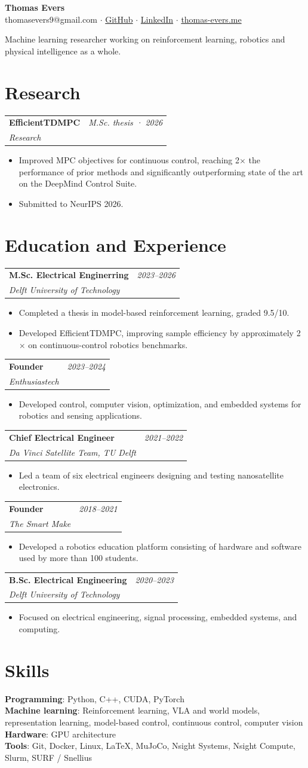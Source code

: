 \documentclass[10pt,a4paper]{article}
\makeatletter
\newcommand{\entry}[4]{%
  \begin{tabular*}{\textwidth}{@{\extracolsep{\fill}}lr}
    \textbf{#2} & \textit{#1}\\
    \textit{#3} &
  \end{tabular*}
  \vspace{-0.7em}
  \begin{itemize}[leftmargin=1.25em,itemsep=0.05em,topsep=0.25em]
    #4
  \end{itemize}
}
\newcommand{\skill}[2]{\textbf{#1}: #2\\[0.2em]}
\makeatother
\begin{document}
\begin{center}
  {\LARGE\bfseries Thomas Evers}\\[0.35em]
  thomasevers9@gmail.com $\cdot$
  \href{https://github.com/Thomasevers2517}{GitHub} $\cdot$
  \href{https://nl.linkedin.com/in/thomas-evers-40b255185/en}{LinkedIn} $\cdot$
  \href{https://thomas-evers.me}{thomas-evers.me}
\end{center}

\vspace{-0.4em}
Machine learning researcher working on reinforcement learning, robotics and physical intelligence as a whole.

\section{Research}
\entry{M.Sc. thesis · 2026}{EfficientTDMPC}{Research}{\item Improved MPC objectives for continuous control, reaching 2$\times$ the performance of prior methods and significantly outperforming state of the art on the DeepMind Control Suite. \item Submitted to NeurIPS 2026.}

\section{Education and Experience}
\entry{2023--2026}{M.Sc. Electrical Enginerring}{Delft University of Technology}{\item Completed a thesis in model-based reinforcement learning, graded 9.5/10.
\item Developed EfficientTDMPC, improving sample efficiency by approximately 2$\times$ on continuous-control robotics benchmarks.}
\entry{2023--2024}{Founder}{Enthusiastech}{\item Developed control, computer vision, optimization, and embedded systems for robotics and sensing applications.}
\entry{2021--2022}{Chief Electrical Engineer}{Da Vinci Satellite Team, TU Delft}{\item Led a team of six electrical engineers designing and testing nanosatellite electronics.}
\entry{2018--2021}{Founder}{The Smart Make}{\item Developed a robotics education platform consisting of hardware and software used by more than 100 students.}
\entry{2020--2023}{B.Sc. Electrical Engineering}{Delft University of Technology}{\item Focused on electrical engineering, signal processing, embedded systems, and computing.}

\section{Skills}
\skill{Programming}{Python, C++, CUDA, PyTorch}
\skill{Machine learning}{Reinforcement learning, VLA and world models, representation learning, model-based control, continuous control, computer vision}
\skill{Hardware}{GPU architecture}
\skill{Tools}{Git, Docker, Linux, LaTeX, MuJoCo, Nsight Systems, Nsight Compute, Slurm, SURF / Snellius}
\end{document}

